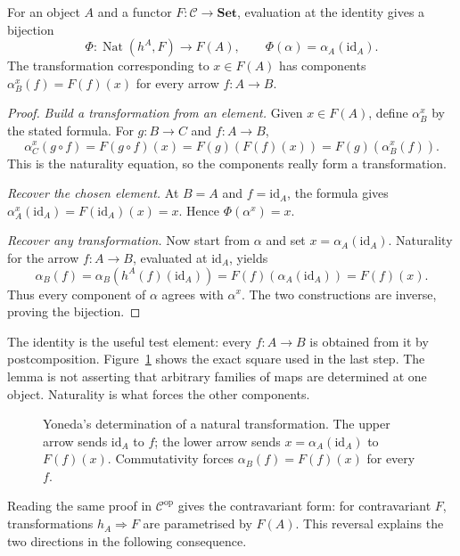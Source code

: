 \begin{theorem}\label{thm:yoneda}
For an object $A$ and a functor $F:\mathcal C\to\mathbf{Set}$, evaluation at the identity gives a bijection
\[
\Phi:\operatorname{Nat}(h^A,F)\longrightarrow F(A),\qquad
\Phi(\alpha)=\alpha_A(\mathrm{id}_A).
\]
The transformation corresponding to $x\in F(A)$ has components
$\alpha^x_B(f)=F(f)(x)$ for every arrow $f:A\to B$.
\end{theorem}

\begin{proof}
\emph{Build a transformation from an element.} Given $x\in F(A)$, define $\alpha^x_B$ by the stated formula. For $g:B\to C$ and $f:A\to B$,
\[
\alpha^x_C(g\circ f)=F(g\circ f)(x)=F(g)(F(f)(x))=F(g)(\alpha^x_B(f)).
\]
This is the naturality equation, so the components really form a transformation.

\emph{Recover the chosen element.} At $B=A$ and $f=\mathrm{id}_A$, the formula gives $\alpha^x_A(\mathrm{id}_A)=F(\mathrm{id}_A)(x)=x$. Hence $\Phi(\alpha^x)=x$.

\emph{Recover any transformation.} Now start from $\alpha$ and set $x=\alpha_A(\mathrm{id}_A)$. Naturality for the arrow $f:A\to B$, evaluated at $\mathrm{id}_A$, yields
\[
\alpha_B(f)=\alpha_B(h^A(f)(\mathrm{id}_A))
 =F(f)(\alpha_A(\mathrm{id}_A))=F(f)(x).
\]
Thus every component of $\alpha$ agrees with $\alpha^x$. The two constructions are inverse, proving the bijection.
\end{proof}

The identity is the useful test element: every $f:A\to B$ is obtained from it by postcomposition. Figure~\ref{fig:v10new-ch01-yoneda} shows the exact square used in the last step. The lemma is not asserting that arbitrary families of maps are determined at one object. Naturality is what forces the other components.

\begin{figure}[ht]
\centering
{}
\caption{Yoneda's determination of a natural transformation. The upper arrow sends $\mathrm{id}_A$ to $f$; the lower arrow sends $x=\alpha_A(\mathrm{id}_A)$ to $F(f)(x)$. Commutativity forces $\alpha_B(f)=F(f)(x)$ for every $f$.}
\label{fig:v10new-ch01-yoneda}
\end{figure}

Reading the same proof in $\mathcal C^{\mathrm{op}}$ gives the contravariant form: for contravariant $F$, transformations $h_A\Rightarrow F$ are parametrised by $F(A)$. This reversal explains the two directions in the following consequence.

